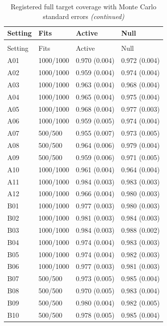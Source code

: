 
\begin{longtable}[t]{llll}
\caption{\label{tab:registered-joint-coverage}Registered full target coverage with Monte Carlo standard errors}\\
\toprule
Setting & Fits & Active & Null\\
\midrule
\endfirsthead
\caption[]{Registered full target coverage with Monte Carlo standard errors \textit{(continued)}}\\
\toprule
Setting & Fits & Active & Null\\
\midrule
\endhead

\endfoot
\bottomrule
\endlastfoot
A01 & 1000/1000 & 0.970 (0.004) & 0.972 (0.004)\\
A02 & 1000/1000 & 0.959 (0.004) & 0.974 (0.004)\\
A03 & 1000/1000 & 0.963 (0.004) & 0.968 (0.004)\\
A04 & 1000/1000 & 0.965 (0.004) & 0.975 (0.004)\\
A05 & 1000/1000 & 0.968 (0.004) & 0.977 (0.003)\\
A06 & 1000/1000 & 0.959 (0.005) & 0.974 (0.004)\\
A07 & 500/500 & 0.955 (0.007) & 0.973 (0.005)\\
A08 & 500/500 & 0.964 (0.006) & 0.979 (0.004)\\
A09 & 500/500 & 0.959 (0.006) & 0.971 (0.005)\\
A10 & 1000/1000 & 0.961 (0.004) & 0.964 (0.004)\\
A11 & 1000/1000 & 0.984 (0.003) & 0.983 (0.003)\\
A12 & 1000/1000 & 0.966 (0.004) & 0.980 (0.003)\\
B01 & 1000/1000 & 0.977 (0.003) & 0.980 (0.003)\\
B02 & 1000/1000 & 0.981 (0.003) & 0.984 (0.003)\\
B03 & 1000/1000 & 0.984 (0.003) & 0.988 (0.002)\\
B04 & 1000/1000 & 0.974 (0.004) & 0.983 (0.003)\\
B05 & 1000/1000 & 0.974 (0.004) & 0.982 (0.003)\\
B06 & 1000/1000 & 0.977 (0.003) & 0.981 (0.003)\\
B07 & 500/500 & 0.973 (0.005) & 0.985 (0.004)\\
B08 & 500/500 & 0.970 (0.005) & 0.983 (0.004)\\
B09 & 500/500 & 0.980 (0.004) & 0.982 (0.005)\\
B10 & 500/500 & 0.978 (0.005) & 0.985 (0.004)\\

\end{longtable}
